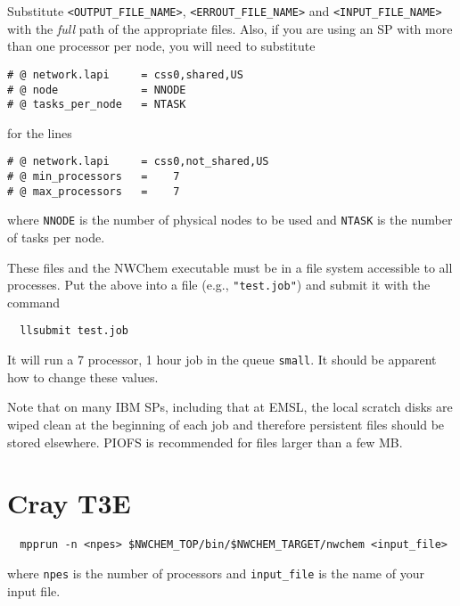 Substitute \verb+<OUTPUT_FILE_NAME>+, \verb+<ERROUT_FILE_NAME>+ and
\verb+<INPUT_FILE_NAME>+ with the {\em full} path of the appropriate
files.  Also, if you are using an SP with more than one processor per node,
you will need to substitute

\begin{verbatim}
# @ network.lapi     = css0,shared,US
# @ node             = NNODE
# @ tasks_per_node   = NTASK
\end{verbatim}
for the lines
\begin{verbatim}
# @ network.lapi     = css0,not_shared,US
# @ min_processors   =    7
# @ max_processors   =    7
\end{verbatim}
where \verb+NNODE+ is the number of physical nodes to be used and 
\verb+NTASK+ is the
number of tasks per node.

These files and the NWChem executable must be in a file system
accessible to all processes.  Put the above into a file (e.g.,
\verb+"test.job"+) and submit it with the command
\begin{verbatim}
  llsubmit test.job
\end{verbatim}
It will run a 7 processor, 1 hour job in the queue \verb+small+.  It
should be apparent how to change these values.

Note that on many IBM SPs, including that at EMSL, the local scratch
disks are wiped clean at the beginning of each job and therefore
persistent files should be stored elsewhere.  PIOFS is recommended for
files larger than a few MB.

\section{Cray T3E}

\begin{verbatim}
  mpprun -n <npes> $NWCHEM_TOP/bin/$NWCHEM_TARGET/nwchem <input_file>
\end{verbatim}

where \verb+npes+ is the number of processors and \verb+input_file+ is the
name of your input file.

%

